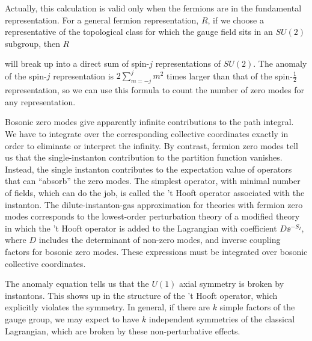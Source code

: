 Actually, this calculation is valid only when the fermions are in the fundamental
representation. For a general fermion representation, $R$, if we choose a
representative of the topological class for which the gauge field sits in an
$SU(2)$ subgroup, then $R$

will break up into a direct sum of spin-$j$ representations of $SU(2)$. The
anomaly of the spin-$j$ representation is
$2\sum_{m=-j}^{j}m^2$ times larger than that of the spin-$\tfrac12$
representation, so we can use this formula to count the number of zero modes for
any representation.

Bosonic zero modes give apparently infinite contributions to the path integral.
We have to integrate over the corresponding collective coordinates exactly in
order to eliminate or interpret the infinity. By contrast, fermion zero modes
tell us that the single-instanton contribution to the partition function
vanishes. Instead, the single instanton contributes to the expectation value of
operators that can ``absorb'' the zero modes. The simplest operator, with
minimal number of fields, which can do the job, is called the 't Hooft operator
associated with the instanton. The dilute-instanton-gas approximation for
theories with fermion zero modes corresponds to the lowest-order perturbation
theory of a modified theory in which the 't Hooft operator is added to the
Lagrangian with coefficient $D\ee^{-S_I}$, where $D$ includes the determinant of
non-zero modes, and inverse coupling factors for bosonic zero modes. These
expressions must be integrated over bosonic collective coordinates.

The anomaly equation tells us that the $U(1)$ axial symmetry is broken by
instantons. This shows up in the structure of the 't Hooft operator, which
explicitly violates the symmetry. In general, if there are $k$ simple factors of
the gauge group, we may expect to have $k$ independent symmetries of the
classical Lagrangian, which are broken by these non-perturbative effects.

\setcounter{footnote}{9}
